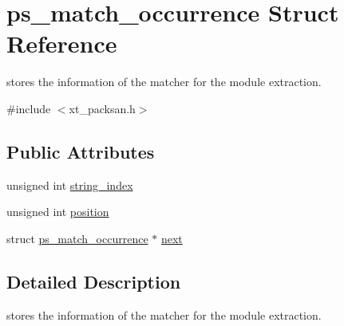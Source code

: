 \hypertarget{structps__match__occurrence}{
\section{ps\_\-match\_\-occurrence Struct Reference}
\label{structps__match__occurrence}
}


stores the information of the matcher for the module extraction.  




{\ttfamily \#include $<$xt\_\-packsan.h$>$}

\subsection*{Public Attributes}
\begin{DoxyCompactItemize}
\item 
unsigned int \hyperlink{structps__match__occurrence_a6b2be4aba7a429a5d4d6d2875cd0fb46}{string\_\-index}
\item 
unsigned int \hyperlink{structps__match__occurrence_a35fbbbfbd119e3851dbab1d79099fb75}{position}
\item 
struct \hyperlink{structps__match__occurrence}{ps\_\-match\_\-occurrence} $\ast$ \hyperlink{structps__match__occurrence_adb7e4752d5cb73360067c26093773585}{next}
\end{DoxyCompactItemize}


\subsection{Detailed Description}
stores the information of the matcher for the module extraction. 

